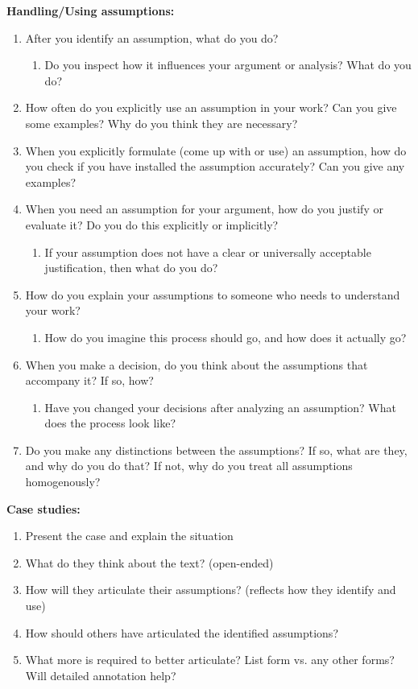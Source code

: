 \smallskip
\noindent \textbf{Handling/Using assumptions:}
\begin{enumerate}
    \item After you identify an assumption, what do you do?
    \begin{enumerate}
        \item Do you inspect how it influences your argument or analysis? What do you do?
    \end{enumerate}
    \item How often do you explicitly use an assumption in your work? Can you give some examples? Why do you think they are necessary?
    \item When you explicitly formulate (come up with or use) an assumption, how do you check if you have installed the assumption accurately? Can you give any examples?
    \item When you need an assumption for your argument, how do you justify or evaluate it? Do you do this explicitly or implicitly?
    \begin{enumerate}
        \item If your assumption does not have a clear or universally acceptable justification, then what do you do?
    \end{enumerate}
    \item How do you explain your assumptions to someone who needs to understand your work? 
    \begin{enumerate}
        \item How do you imagine this process should go, and how does it actually go? 
    \end{enumerate}
    \item When you make a decision, do you think about the assumptions that accompany it? If so, how?
    \begin{enumerate}
        \item Have you changed your decisions after analyzing an assumption? What does the process look like?
    \end{enumerate}
    \item Do you make any distinctions between the assumptions? If so, what are they, and why do you do that? If not, why do you treat all assumptions homogenously?
\end{enumerate}

\smallskip
\noindent \textbf{Case studies:}
\begin{enumerate}
    \item Present the case and explain the situation
    \item What do they think about the text? (open-ended)
    \item How will they articulate their assumptions? (reflects how they identify and use)
    \item How should others have articulated the identified assumptions?
    \item What more is required to better articulate? List form vs. any other forms? Will detailed annotation help?
\end{enumerate}
